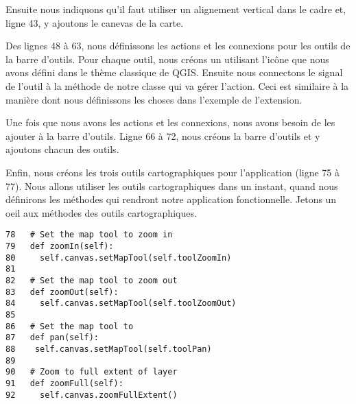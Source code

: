 Ensuite nous indiquons qu'il faut utiliser un alignement vertical dans le cadre et, ligne 43, y ajoutons le canevas de la carte.

Des lignes 48 \`a 63, nous d\'efinissons les actions et les connexions pour les outils de la barre d'outils. Pour chaque outil, nous cr\'eons un  utilisant l'ic\^one que nous avons d\'efini dans le th\`eme classique de QGIS. Ensuite nous connectons le signal  de l'outil \`a la m\'ethode de notre classe qui va g\'erer l'action. Ceci est similaire \`a la mani\`ere dont nous d\'efinissons les choses dans l'exemple de l'extension.

Une fois que nous avons les actions et les connexions, nous avons besoin de les ajouter \`a la barre d'outils. Ligne 66 \`a 72, nous cr\'eons la barre d'outils et y ajoutons chacun des outils.

Enfin, nous cr\'eons les trois outils cartographiques pour l'application (ligne 75 \`a 77). Nous allons utiliser les outils cartographiques dans un instant, quand nous d\'efinirons les m\'ethodes qui rendront notre application fonctionnelle. Jetons un oeil aux m\'ethodes des outils cartographiques.

\begin{verbatim}
78   # Set the map tool to zoom in
79   def zoomIn(self):
80     self.canvas.setMapTool(self.toolZoomIn)
81 
82   # Set the map tool to zoom out
83   def zoomOut(self):
84     self.canvas.setMapTool(self.toolZoomOut)
85 
86   # Set the map tool to 
87   def pan(self):
88    self.canvas.setMapTool(self.toolPan)
89 
90   # Zoom to full extent of layer
91   def zoomFull(self):
92     self.canvas.zoomFullExtent()
\end{verbatim}


